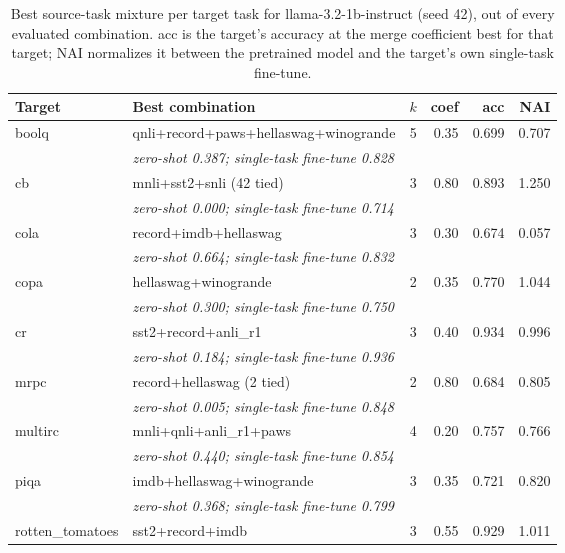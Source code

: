 \begin{table}[t]
  \centering
  \caption{Best source-task mixture per target task for llama-3.2-1b-instruct (seed 42), out of every evaluated combination. acc is the target's accuracy at the merge coefficient best for that target; NAI normalizes it between the pretrained model and the target's own single-task fine-tune.}
  \label{tab:target-best-per-target}
  \begin{tabular}{llrrrr}
    \toprule
    Target & Best combination & $k$ & coef & acc & NAI \\
    \midrule
    boolq & qnli+record+paws+hellaswag+winogrande & 5 & 0.35 & 0.699 & 0.707 \\
    & \multicolumn{5}{l}{\textit{zero-shot 0.387; single-task fine-tune 0.828}} \\
    \addlinespace
    cb & mnli+sst2+snli (42 tied) & 3 & 0.80 & 0.893 & 1.250 \\
    & \multicolumn{5}{l}{\textit{zero-shot 0.000; single-task fine-tune 0.714}} \\
    \addlinespace
    cola & record+imdb+hellaswag & 3 & 0.30 & 0.674 & 0.057 \\
    & \multicolumn{5}{l}{\textit{zero-shot 0.664; single-task fine-tune 0.832}} \\
    \addlinespace
    copa & hellaswag+winogrande & 2 & 0.35 & 0.770 & 1.044 \\
    & \multicolumn{5}{l}{\textit{zero-shot 0.300; single-task fine-tune 0.750}} \\
    \addlinespace
    cr & sst2+record+anli\_r1 & 3 & 0.40 & 0.934 & 0.996 \\
    & \multicolumn{5}{l}{\textit{zero-shot 0.184; single-task fine-tune 0.936}} \\
    \addlinespace
    mrpc & record+hellaswag (2 tied) & 2 & 0.80 & 0.684 & 0.805 \\
    & \multicolumn{5}{l}{\textit{zero-shot 0.005; single-task fine-tune 0.848}} \\
    \addlinespace
    multirc & mnli+qnli+anli\_r1+paws & 4 & 0.20 & 0.757 & 0.766 \\
    & \multicolumn{5}{l}{\textit{zero-shot 0.440; single-task fine-tune 0.854}} \\
    \addlinespace
    piqa & imdb+hellaswag+winogrande & 3 & 0.35 & 0.721 & 0.820 \\
    & \multicolumn{5}{l}{\textit{zero-shot 0.368; single-task fine-tune 0.799}} \\
    \addlinespace
    rotten\_tomatoes & sst2+record+imdb & 3 & 0.55 & 0.929 & 1.011 \\

\end{tabular}
\end{table}
